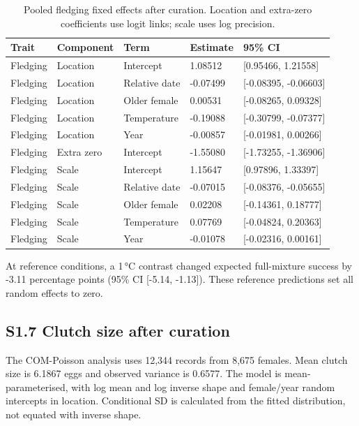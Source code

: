 \documentclass{article}
\begin{document}
\begin{table}[!ht]\centering\scriptsize\singlespacing
\caption{Pooled fledging fixed effects after curation. Location and extra-zero coefficients use logit links; scale uses log precision.}\label{tab:primary-ZIyear-fixed}
\begin{tabular}{lllll}\toprule
Trait & Component & Term & Estimate & 95\% CI\\\midrule
Fledging & Location & Intercept & 1.08512 & [0.95466, 1.21558]\\
Fledging & Location & Relative date & -0.07499 & [-0.08395, -0.06603]\\
Fledging & Location & Older female & 0.00531 & [-0.08265, 0.09328]\\
Fledging & Location & Temperature & -0.19088 & [-0.30799, -0.07377]\\
Fledging & Location & Year & -0.00857 & [-0.01981, 0.00266]\\
Fledging & Extra zero & Intercept & -1.55080 & [-1.73255, -1.36906]\\
Fledging & Scale & Intercept & 1.15647 & [0.97896, 1.33397]\\
Fledging & Scale & Relative date & -0.07015 & [-0.08376, -0.05655]\\
Fledging & Scale & Older female & 0.02208 & [-0.14361, 0.18777]\\
Fledging & Scale & Temperature & 0.07769 & [-0.04824, 0.20363]\\
Fledging & Scale & Year & -0.01078 & [-0.02316, 0.00161]\\
\bottomrule\end{tabular}\end{table}
At reference conditions, a 1\,\si{\degreeCelsius} contrast changed expected full-mixture success by -3.11 percentage points (95\% CI [-5.14, -1.13]). These reference predictions set all random effects to zero.

\subsection{S1.7 Clutch size after curation}

The COM-Poisson analysis uses 12,344 records from 8,675 females. Mean clutch size is 6.1867 eggs and observed variance is 0.6577. The model is mean-parameterised, with log mean and log inverse shape and female/year random intercepts in location. Conditional SD is calculated from the fitted distribution, not equated with inverse shape.
\end{document}
